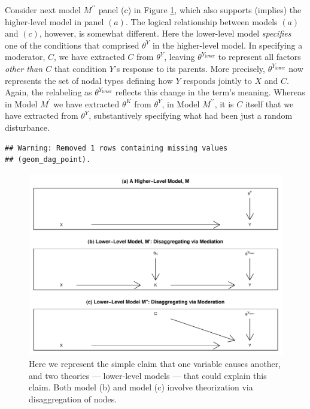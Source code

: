 \documentclass[
  12pt,
]{book}
\begin{document}
Consider next model \(M^{\prime\prime}\) panel (c) in Figure \ref{fig:Highlow}, which also supports (implies) the higher-level model in panel \((a)\). The logical relationship between models \((a)\) and \((c)\), however, is somewhat different. Here the lower-level model \emph{specifies} one of the conditions that comprised \(\theta^Y\) in the higher-level model. In specifying a moderator, \(C\), we have extracted \(C\) from \(\theta^Y\), leaving \(\theta^{Y_\text{lower}}\) to represent all factors \emph{other than \(C\)} that condition \(Y\)'s response to its parents. More precisely, \(\theta^{Y_\text{lower}}\) now represents the set of nodal types defining how \(Y\) responds jointly to \(X\) and \(C\). Again, the relabeling as \(\theta^{Y_\text{lower}}\) reflects this change in the term's meaning. Whereas in Model \(M^{\prime}\) we have extracted \(\theta^K\) from \(\theta^Y\), in Model \(M^{\prime\prime}\), it is \(C\) itself that we have extracted from \(\theta^Y\), substantively specifying what had been just a random disturbance.

\begin{verbatim}
## Warning: Removed 1 rows containing missing values
## (geom_dag_point).
\end{verbatim}

\begin{figure}

{\centering \includegraphics[width=0.8\linewidth]{ii_files/figure-latex/Highlow-1} 

}

\caption{Here we represent the simple claim that one variable causes another, and two theories --- lower-level models --- that could explain this claim. Both model (b) and model (c) involve theorization via disaggregation of nodes.}\label{fig:Highlow}
\end{figure}
\end{document}
